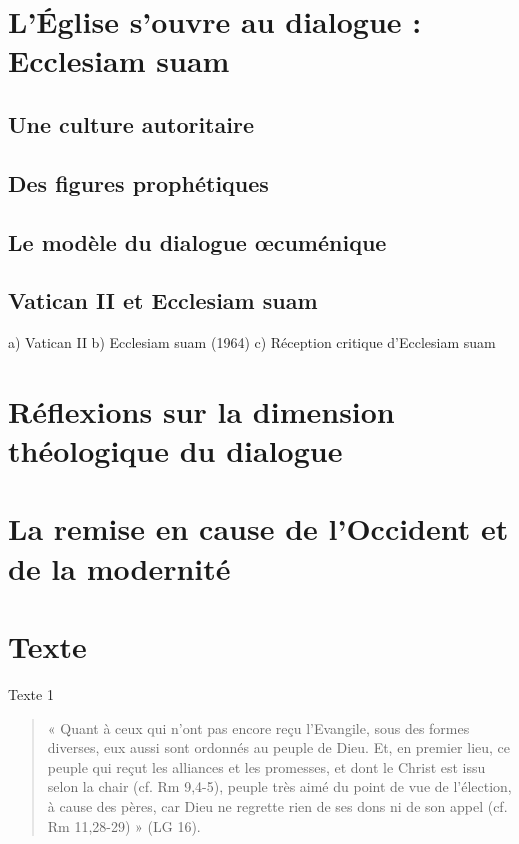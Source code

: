     
  
\section{L’Église  s’ouvre  au  dialogue  :  Ecclesiam  suam}
 
 
\subsection{Une  culture  autoritaire}
 
\subsection{ Des  figures  prophétiques}

 
\subsection{Le  modèle  du dialogue  œcuménique}

\subsection{Vatican II et  Ecclesiam  suam}
  a)  Vatican II b)  Ecclesiam  suam  (1964) c)  Réception critique  d’Ecclesiam  suam
  
      
 
  
\section{Réflexions  sur  la  dimension  théologique  du  dialogue}
  
\section{La remise  en  cause  de  l’Occident et  de  la modernité }
 
    
  
\section{Texte}

Texte  1

\begin{quote}
    «  Quant  à  ceux  qui  n’ont  pas  encore  reçu  l’Evangile,  sous  des  formes  diverses,  eux  aussi  sont ordonnés  au  peuple  de  Dieu.  Et,  en  premier  lieu,  ce  peuple  qui  reçut  les  alliances  et  les promesses,  et  dont  le  Christ  est  issu  selon  la  chair  (cf.  Rm  9,4-5),  peuple  très  aimé  du  point  de vue  de  l’élection,  à  cause  des  pères,  car  Dieu  ne  regrette  rien  de  ses  dons  ni  de  son  appel  (cf. Rm 11,28-29)  »  (LG  16). 
\end{quote}


